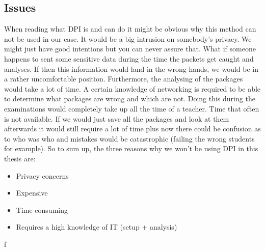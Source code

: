 \subsection{Issues}
When reading what DPI is and can do it might be obvious why this method can not be used in our case. It would be a big intrusion on somebody's privacy. We might just have good intentions but you can never assure that. What if someone happens to sent some sensitive data during the time the packets get caught and analyses. If then this information would land in the wrong hands, we would be in a rather uncomfortable position. Furthermore, the analysing of the packages would take a lot of time. A certain knowledge of networking is required to be able to determine what packages are wrong and which are not. Doing this during the examinations would completely take up all the time of a teacher. Time that often is not available. If we would just save all the packages and look at them afterwards it would still require a lot of time plus now there could be confusion as to who was who and mistakes would be catastrophic (failing the wrong students for example).
So to sum up, the three reasons why we won't be using DPI in this thesis are:
\begin{itemize}
\item Privacy concerns
\item Expensive
\item Time consuming
\item Requires a high knowledge of IT (setup + analysis)
\end{itemize}



f
